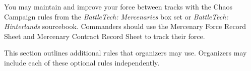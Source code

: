 You may maintain and improve your force between tracks with the Chaos Campaign rules from the \emph{BattleTech: Mercenaries} box set or \emph{BattleTech: Hinterlands} sourcebook.
Commanders should use the Mercenary Force Record Sheet and Mercenary Contract Record Sheet to track their force.

This section outlines additional rules that organizers may use.
Organizers may include each of these optional rules independently.
